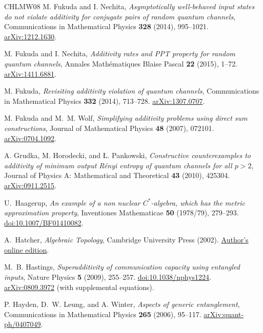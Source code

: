 \documentclass[11pt]{article}
\numberwithin{equation}{section}
\theoremstyle{boldremark}\newtheorem{remark}[theorem]{Remark}
\begin{document}
\begin{thebibliography}{CHLMW08}
M. Fukuda and I. Nechita,
\emph{Asymptotically well-behaved input states do not violate additivity for conjugate pairs of random quantum channels},
Communications in Mathematical Physics \textbf{328} (2014), 995--1021.
\href{https://arxiv.org/abs/1212.1630}{arXiv:1212.1630}.

M. Fukuda and I. Nechita,
\emph{Additivity rates and PPT property for random quantum channels},
Annales Math\'ematiques Blaise Pascal \textbf{22} (2015), 1--72.
\href{https://arxiv.org/abs/1411.6881}{arXiv:1411.6881}.

M. Fukuda,
\emph{Revisiting additivity violation of quantum channels},
Communications in Mathematical Physics \textbf{332} (2014), 713--728.
\href{https://arxiv.org/abs/1307.0707}{arXiv:1307.0707}.

M. Fukuda and M.~M. Wolf,
\emph{Simplifying additivity problems using direct sum constructions},
Journal of Mathematical Physics \textbf{48} (2007), 072101.
\href{https://arxiv.org/abs/0704.1092}{arXiv:0704.1092}.

A. Grudka, M. Horodecki, and \L{}. Pankowski,
\emph{Constructive counterexamples to additivity of minimum output R\'enyi entropy of quantum channels for all $p>2$},
Journal of Physics A: Mathematical and Theoretical \textbf{43} (2010), 425304.
\href{https://arxiv.org/abs/0911.2515}{arXiv:0911.2515}.

U.~Haagerup,
\emph{An example of a non nuclear $C^*$-algebra, which has the metric
approximation property},
Inventiones Mathematicae \textbf{50} (1978/79), 279--293.
\href{https://doi.org/10.1007/BF01410082}{doi:10.1007/BF01410082}.

A.~Hatcher,
\emph{Algebraic Topology},
Cambridge University Press (2002).
\href{https://pi.math.cornell.edu/~hatcher/AT/AT.pdf}{Author's online edition}.

M.~B. Hastings,
\emph{Superadditivity of communication capacity using entangled inputs},
Nature Physics \textbf{5} (2009), 255--257.
\href{https://doi.org/10.1038/nphys1224}{doi:10.1038/nphys1224}.
\href{https://arxiv.org/abs/0809.3972}{arXiv:0809.3972} (with supplemental equations).

P. Hayden, D.~W. Leung, and A. Winter,
\emph{Aspects of generic entanglement},
Communications in Mathematical Physics \textbf{265} (2006), 95--117.
\href{https://arxiv.org/abs/quant-ph/0407049}{arXiv:quant-ph/0407049}.


\end{thebibliography}
\end{document}
